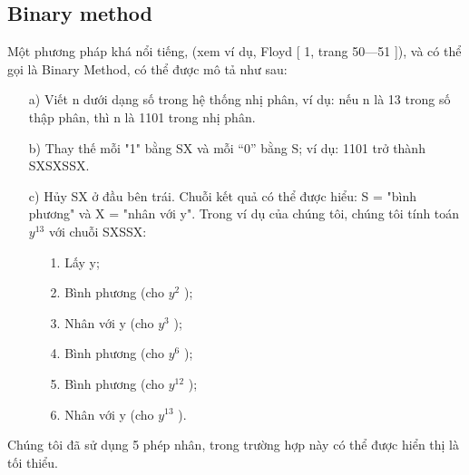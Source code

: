 \documentclass{article}
\begin{document}
\setlength{\columnsep}{1cm}
\begin{multicols}{3}

\noindent
{}

\section*{\LARGE Binary method}

\qquad Một phương pháp khá nổi tiếng, (xem ví dụ, Floyd [ 1, trang 50—51 ]), 
  và có thể gọi là Binary Method, có thể được mô tả như sau:

    \begin{itemize}
    \item[a)] Viết n dưới dạng số trong hệ thống nhị phân, ví dụ: nếu n là 13 trong số thập phân, thì n là 1101 trong nhị phân.
    \item[b)] Thay thế mỗi "1" bằng SX và mỗi “0” bằng S; ví dụ: 1101 trở thành SXSXSSX.
    \item[c)] Hủy SX ở đầu bên trái. Chuỗi kết quả có thể được hiểu: S = "bình phương" và X = "nhân với y". Trong ví dụ của chúng tôi, 
    chúng tôi tính toán $y^{13}$ với chuỗi SXSSX:
    \begin{itemize} %
        \item[1.] Lấy y;
        \item[2.] Bình phương (cho $y^{2}$ );
        \item[3.] Nhân với y (cho $y^{3}$ );
        \item[4.] Bình phương (cho $y^{6}$ );
        \item[5.] Bình phương (cho $y^{12}$ );
        \item[6.] Nhân với y (cho $y^{13}$ ).
      \end{itemize}
  \end{itemize}
  \qquad Chúng tôi đã sử dụng 5 phép nhân, trong trường hợp này có thể được hiển thị là tối thiểu.


\end{multicols}
\end{document}
